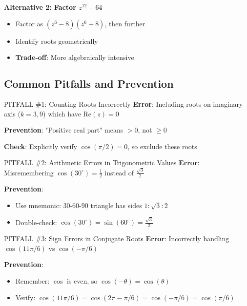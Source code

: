 \documentclass[11pt]{article}
\begin{document}
\begin{roadmapbox}
\textbf{Alternative 2: Factor $z^{12}-64$}
\begin{itemize}[leftmargin=*]
    \item Factor as $(z^6-8)(z^6+8)$, then further
    \item Identify roots geometrically
    \item \textbf{Trade-off}: More algebraically intensive
\end{itemize}

\subsection*{Common Pitfalls and Prevention}

\begin{highlightbox}{PITFALL \#1: Counting Roots Incorrectly}
\textbf{Error}: Including roots on imaginary axis ($k=3,9$) which have $\text{Re}(z)=0$

\textbf{Prevention}: "Positive real part" means $>0$, not $\geq 0$

\textbf{Check}: Explicitly verify $\cos(\pi/2) = 0$, so exclude these roots
\end{highlightbox}

\begin{highlightbox}{PITFALL \#2: Arithmetic Errors in Trigonometric Values}
\textbf{Error}: Misremembering $\cos(30^\circ) = \frac{1}{2}$ instead of $\frac{\sqrt{3}}{2}$

\textbf{Prevention}: 
\begin{itemize}
    \item Use mnemonic: 30-60-90 triangle has sides $1:\sqrt{3}:2$
    \item Double-check: $\cos(30^\circ) = \sin(60^\circ) = \frac{\sqrt{3}}{2}$
\end{itemize}
\end{highlightbox}

\begin{highlightbox}{PITFALL \#3: Sign Errors in Conjugate Roots}
\textbf{Error}: Incorrectly handling $\cos(11\pi/6)$ vs $\cos(-\pi/6)$

\textbf{Prevention}: 
\begin{itemize}
    \item Remember: $\cos$ is even, so $\cos(-\theta) = \cos(\theta)$
    \item Verify: $\cos(11\pi/6) = \cos(2\pi - \pi/6) = \cos(-\pi/6) = \cos(\pi/6)$
\end{itemize}
\end{highlightbox}


\end{roadmapbox}
\end{document}
